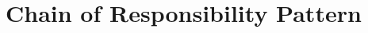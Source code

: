 \documentclass[a4paper]{article}
\begin{document}
\setcounter{page}{1} 

\newpage

\tableofcontents
\newpage


\newpage

 \section{Chain of Responsibility Pattern}
 
 
 
 
 

 \newpage

\nocite{*} 


\newpage

% 
\end{document}
